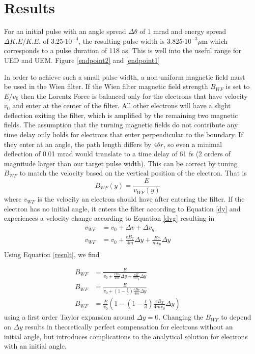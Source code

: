 \documentclass[12pt,letterpaper]{article}
\newcommand{\ee}[1]{\cdot10^{#1}}
\newcommand{\eqqref}[1]{Equation \ref{#1}}
\newcommand{\dv}{\Delta v}
\newcommand{\dy}{\Delta y}
\begin{document}
\section{Results}
For an initial pulse with an angle spread $\Delta \theta$ of 1 mrad and energy spread $\Delta K.E/K.E.$ of 3.25$\ee{-4}$, the resulting pulse width is 3.825$\ee{-3} \mu$m which corresponds to a pulse duration of 118 as. This is well into the useful range for UED and UEM. Figure \ref{endpoint2} and \ref{endpoint1}

In order to achieve such a small pulse width, a non-uniform magnetic field must be used in the Wien filter. 
If the Wien filter magnetic field strength $B_{WF}$ is set to $E/v_0$ then the Lorentz Force is balanced only for the electrons that have velocity $v_0$ and enter at the center of the filter. 
All other electrons will have a slight deflection exiting the filter, which is amplified by the remaining two magnetic fields. 
The assumption that the turning magnetic fields do not contribute any time delay only holds for electrons that enter perpendicular to the boundary. 
If they enter at an angle, the path length differs by $4\theta r$, so even a minimal deflection of 0.01 mrad would translate to a time delay of 61 fs (2 orders of magnitude larger than our target pulse width). 
This can be correct by tuning $B_{WF}$ to match the velocity based on the vertical position of the electron. That is 
\begin{equation}
   B_{WF}(y)=\frac{E}{v_{WF}(y)}
\end{equation}
where $v_{WF}$ is the velocity an electron should have after entering the filter. If the electron has no initial angle, it enters the filter according to \eqqref{dy} and experiences a velocity change according to \eqqref{dvg} resulting in 
\begin{align}
   v_{WF}&=v_0+\dv+\dv_g \nonumber \\
   v_{WF}&=v_0+\frac{eB_T}{4m} \dy+\frac{Ee}{mv_0}\dy \nonumber \\
\end{align}
Using \eqqref{result}, we find 

\begin{align}
   B_{WF}&=\frac{E}{v_0+\frac{eB_T}{4m} \dy+\frac{eE}{mv_0}\dy} \\
   B_{WF}&=\frac{E}{v_0+\left(1 -\frac{l}{d}\right)\frac{eB_T }{4 m}\dy} \label{bwf1}\\
   B_{WF}&=\frac{E}{v_0}\left(1-\left(1 -\frac{l}{d}\right)\frac{eB_T }{4 m v_0}\dy\right) \label{bwf2}
\end{align}
using a first order Taylor expansion around $\dy=0$.
Changing the $B_{WF}$ to depend on $\dy$ results in theoretically perfect compensation for electrons without an initial angle, but introduces complications to the analytical solution for electrons with an initial angle. 
\end{document}
